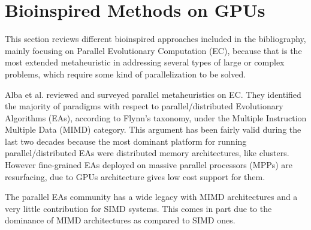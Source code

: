 \documentclass[review]{elsarticle}
\begin{document}

\section{Bioinspired Methods on GPUs}
\label{sec:bioinfor_apps}

This section reviews different bioinspired approaches included in the bibliography, mainly focusing on Parallel Evolutionary Computation (EC), because that is the most extended metaheuristic in addressing several types of large or complex problems, which require some kind of parallelization to be solved.

Alba et al. \cite{Alba2005book} reviewed and surveyed parallel metaheuristics on EC. They identified the majority of paradigms with respect to parallel/distributed Evolutionary Algorithms (EAs), according to Flynn's taxonomy, under the Multiple Instruction Multiple Data (MIMD) category. This argument has been fairly valid during the last two decades because the most dominant platform for running parallel/distributed EAs were distributed memory architectures, like clusters. However fine-grained EAs deployed on massive parallel processors (MPPs) are resurfacing, due to GPUs architecture gives low cost support for them.

The parallel EAs community has a wide legacy with MIMD architectures and a very little contribution for SIMD systems. This comes in part due to the dominance of MIMD architectures as compared to SIMD ones.
\end{document}
